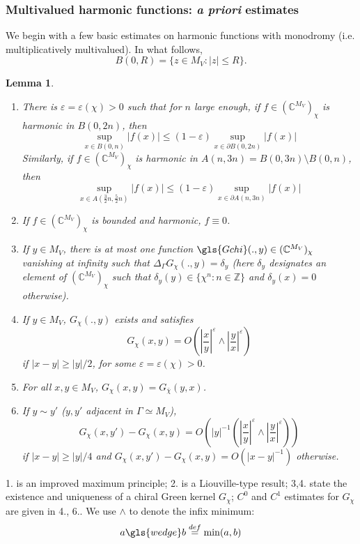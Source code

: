 \documentclass[10pt]{article}
\newcommand{\Z}{\mathbb{Z}}
\newcommand{\C}{\mathbb{C}}
\newcommand{\eps}{\varepsilon}
\newcommand{\Lap}{\Delta\!}
\newtheorem{Lem}[thm]{Lemma}
\begin{document}
\subsubsection{Multivalued harmonic functions: {\em a priori} estimates}

We begin with a few basic estimates on harmonic functions with monodromy (i.e. multiplicatively multivalued). In what follows, 
$$B(0,R)=\{z\in M_V: |z|\leq R\}.$$

\begin{Lem}\label{Lem:chirharmest}
\begin{enumerate}
\item There is $\eps=\eps(\chi)>0$ such that for $n$ large enough, if $f\in(\C^{M_V})_\chi$ is harmonic in $B(0,2n)$, then
$$\sup_{x\in B(0,n)} |f(x)|\leq (1-\eps)\sup_{x\in \partial B(0,2n)}|f(x)|$$
Similarly,  if $f\in(\C^{M_V})_\chi$ is harmonic in $A(n,3n)=B(0,3n)\setminus B(0,n)$, then
$$\sup_{x\in A(\frac 32n,\frac 52n)} |f(x)|\leq (1-\eps)\sup_{x\in \partial A(n,3n)}|f(x)|$$
\item If $f\in (\C^{M_V})_\chi$ is  bounded and harmonic, $f\equiv 0$.
\item If $y\in M_V$, there is at most one function $\gls{Gchi}(.,y)\in (\C^{M_V})_\chi$ vanishing at infinity such that $\Lap_\Gamma G_\chi(.,y)=\delta_y$ (here $\delta_y$ designates an element of $(\C^{M_V})_\chi$ such that $\delta_y(y)\in\{\chi^n:n\in\Z\}$ and $\delta_y(x)=0$ otherwise).
\item  If $y\in M_V$, $G_\chi(.,y)$ exists and satisfies
$$G_\chi(x,y)=O(\left|\frac xy\right|^\eps\wedge \left|\frac yx\right|^\eps)$$
if $|x-y|\geq|y|/2$, for some $\eps=\eps(\chi)>0$.
\item For all $x,y\in M_V$, $G_\chi(x,y)=G_{\bar\chi}(y,x)$.
\item If $y\sim y'$ ($y,y'$ adjacent in $\Gamma\simeq M_V$),
$$G_\chi(x,y')-G_\chi(x,y)=O(|y|^{-1}(\left|\frac xy\right|^\eps\wedge \left|\frac yx\right|^\eps))$$
if $|x-y|\geq |y|/4$ and $G_\chi(x,y')-G_\chi(x,y)=O(|x-y|^{-1})$ otherwise.
\end{enumerate}
\end{Lem}
1. is an improved maximum principle; 2. is a Liouville-type result; 3,4. state the existence and uniqueness of a chiral Green kernel $G_\chi$; $C^0$ and $C^1$ estimates for $G_\chi$ are given in 4., 6.. We use $\wedge$ to denote the infix minimum:
$$a\gls{wedge} b\stackrel{def}{=}\min (a,b)$$
\end{document}
